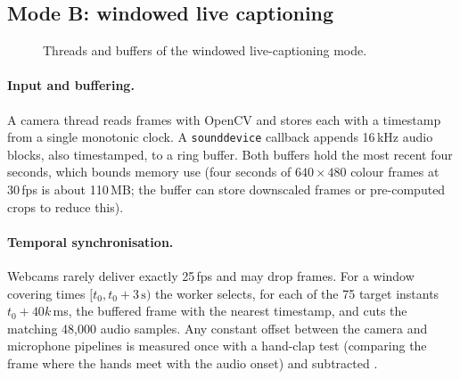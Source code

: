 \subsection{Mode B: windowed live captioning}

\begin{figure}[H]
\centering
{}
\caption{Threads and buffers of the windowed live-captioning mode.}
\label{fig:live}
\end{figure}

\paragraph{Input and buffering.} A camera thread reads frames with OpenCV and
stores each with a timestamp from a single monotonic clock. A
\texttt{sounddevice} callback appends 16\,kHz audio blocks, also timestamped, to a
ring buffer. Both buffers hold the most recent four seconds, which bounds memory
use (four seconds of $640\times480$ colour frames at 30\,fps is about 110\,MB; the
buffer can store downscaled frames or pre-computed crops to reduce this).

\paragraph{Temporal synchronisation.} Webcams rarely deliver exactly 25\,fps and
may drop frames. For a window covering times $[t_0, t_0+3\,\text{s})$ the worker
selects, for each of the 75 target instants $t_0 + 40k$\,ms, the buffered frame
with the nearest timestamp, and cuts the matching 48{,}000 audio samples. Any
constant offset between the camera and microphone pipelines is measured once
with a hand-clap test (comparing the frame where the hands meet with the audio
onset) and subtracted \rec.


